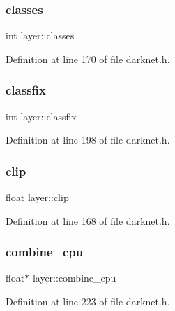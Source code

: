 \mbox{\label{structlayer_af8d01e54a44d8682c38d431c32faed45}} 
\subsubsection{\texorpdfstring{classes}{classes}}
{\footnotesize\ttfamily int layer\+::classes}



Definition at line 170 of file darknet.\+h.

\mbox{\label{structlayer_a510630027ff3061ae0ad07e151fbf1a5}} 
\subsubsection{\texorpdfstring{classfix}{classfix}}
{\footnotesize\ttfamily int layer\+::classfix}



Definition at line 198 of file darknet.\+h.

\mbox{\label{structlayer_a1728042fca5440265c959059a869bd2f}} 
\subsubsection{\texorpdfstring{clip}{clip}}
{\footnotesize\ttfamily float layer\+::clip}



Definition at line 168 of file darknet.\+h.

\mbox{\label{structlayer_abf10dce2bd742799a95eb1241e0c4e71}} 
\subsubsection{\texorpdfstring{combine\_cpu}{combine\_cpu}}
{\footnotesize\ttfamily float$\ast$ layer\+::combine\+\_\+cpu}



Definition at line 223 of file darknet.\+h.

\mbox{\label{structlayer_a00fca0bda761ca0a2ceaf81934b31293}} 
